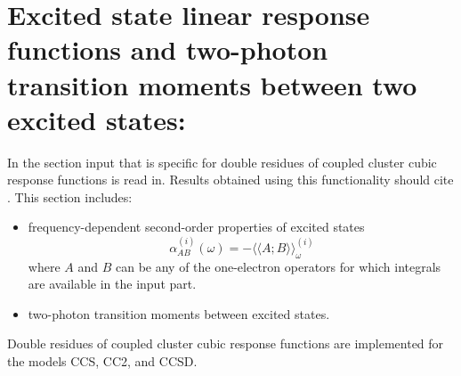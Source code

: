 
\section{Excited state linear response functions and
         two-photon transition moments between two excited states:
         }
\label{sec:ccexlr}

In the  section input that is specific for 
double residues of coupled cluster cubic response functions 
is read in.
Results obtained using this functionality should cite
\cite{Haettig:EXCITED,Haettig:EXLR}. 
This section includes:
\begin{itemize}
\item frequency-dependent second-order properties of excited states
      $$ \alpha^{(i)}_{AB}(\omega) = 
         -\langle\langle A; B\rangle\rangle^{(i)}_\omega $$
      where $A$ and $B$ can be any of the one-electron operators
      for which integrals  are available in the 
      input part.
\item two-photon transition moments between excited states.
\end{itemize}
Double residues of coupled cluster cubic response functions are
implemented for the models CCS, CC2, and CCSD.

\begin{center}
\end{center}

